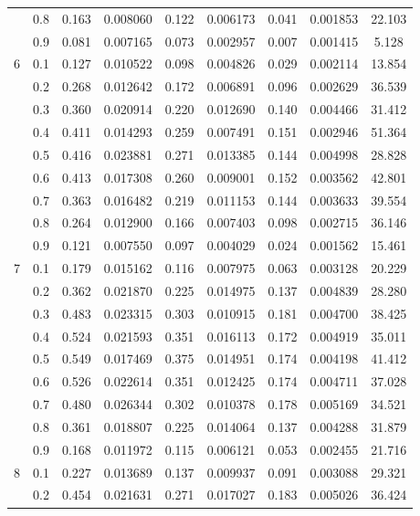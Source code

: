 \begin{longtable}{ | c | c || c | c | c | c | c | c | c | }
 & 0.8 & 0.163 & 0.008060 & 0.122 & 0.006173 & 0.041 & 0.001853 & 22.103 \\
 & 0.9 & 0.081 & 0.007165 & 0.073 & 0.002957 & 0.007 & 0.001415 & 5.128 \\
 \hline
\multirow{9}{*}{6} & 0.1 & 0.127 & 0.010522 & 0.098 & 0.004826 & 0.029 & 0.002114 & 13.854 \\
 & 0.2 & 0.268 & 0.012642 & 0.172 & 0.006891 & 0.096 & 0.002629 & 36.539 \\
 & 0.3 & 0.360 & 0.020914 & 0.220 & 0.012690 & 0.140 & 0.004466 & 31.412 \\
 & 0.4 & 0.411 & 0.014293 & 0.259 & 0.007491 & 0.151 & 0.002946 & 51.364 \\
 & 0.5 & 0.416 & 0.023881 & 0.271 & 0.013385 & 0.144 & 0.004998 & 28.828 \\
 & 0.6 & 0.413 & 0.017308 & 0.260 & 0.009001 & 0.152 & 0.003562 & 42.801 \\
 & 0.7 & 0.363 & 0.016482 & 0.219 & 0.011153 & 0.144 & 0.003633 & 39.554 \\
 & 0.8 & 0.264 & 0.012900 & 0.166 & 0.007403 & 0.098 & 0.002715 & 36.146 \\
 & 0.9 & 0.121 & 0.007550 & 0.097 & 0.004029 & 0.024 & 0.001562 & 15.461 \\
 \hline
\multirow{9}{*}{7} & 0.1 & 0.179 & 0.015162 & 0.116 & 0.007975 & 0.063 & 0.003128 & 20.229 \\
 & 0.2 & 0.362 & 0.021870 & 0.225 & 0.014975 & 0.137 & 0.004839 & 28.280 \\
 & 0.3 & 0.483 & 0.023315 & 0.303 & 0.010915 & 0.181 & 0.004700 & 38.425 \\
 & 0.4 & 0.524 & 0.021593 & 0.351 & 0.016113 & 0.172 & 0.004919 & 35.011 \\
 & 0.5 & 0.549 & 0.017469 & 0.375 & 0.014951 & 0.174 & 0.004198 & 41.412 \\
 & 0.6 & 0.526 & 0.022614 & 0.351 & 0.012425 & 0.174 & 0.004711 & 37.028 \\
 & 0.7 & 0.480 & 0.026344 & 0.302 & 0.010378 & 0.178 & 0.005169 & 34.521 \\
 & 0.8 & 0.361 & 0.018807 & 0.225 & 0.014064 & 0.137 & 0.004288 & 31.879 \\
 & 0.9 & 0.168 & 0.011972 & 0.115 & 0.006121 & 0.053 & 0.002455 & 21.716 \\
 \hline
\multirow{9}{*}{8} & 0.1 & 0.227 & 0.013689 & 0.137 & 0.009937 & 0.091 & 0.003088 & 29.321 \\
 & 0.2 & 0.454 & 0.021631 & 0.271 & 0.017027 & 0.183 & 0.005026 & 36.424 \\

\end{longtable}

